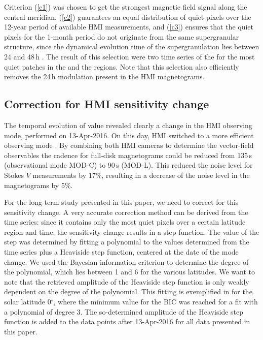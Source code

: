 \documentclass{aa}
\begin{document}
Criterion (\ref{c1}) was chosen to get the strongest magnetic field signal along the central meridian. (\ref{c2}) guarantees an equal distribution of quiet pixels over the 12-year period of available HMI measurements, and (\ref{c3}) ensures that the quiet pixels for the 1-month period do not originate from the same supergranular structure, since the dynamical evolution time of the supergranulation lies between 24 and 48\,h \cite[]{2010LRSP....7....2R}. The result of this selection were two time series of the \brms{} for the most quiet patches in the \NW{} and the \IN{} regions. 
Note that this selection also efficiently removes the 24\,h modulation present in the HMI magnetograms.

\subsection{Correction for HMI sensitivity change\label{sensicorr}}

The temporal evolution of \inw{} \brms{} value
revealed clearly a change in the HMI observing mode, performed on 13-Apr-2016. On this day, HMI switched to a more efficient observing mode \cite[see][]{2018SoPh..293...45H,2014SoPh..289.3483H,2016SoPh..291.1887C}. By combining both HMI cameras to determine the vector-field observables the cadence for full-disk magnetograms could be reduced from 135\,s (observational mode MOD-C) to 90\,s (MOD-L). This reduced the noise level for Stokes $V$ measurements by 17\%, resulting in a decrease of the noise level in the \los{} magnetograms by 5\%.

For the long-term study presented in this paper, we need to correct for this sensitivity change. A very accurate correction method can be derived from the \inw{} time series: since it contains only the most quiet pixels over a certain latitude region and time, the sensitivity change results in a step function. The value of the step was determined by fitting a polynomial to the \brms{} values determined from the \inw{} time series plus a Heaviside step function, centered at the date of the mode change. We used the Bayesian information criterion \cite[BIC,][]{Stoica2004} to determine the degree of the polynomial, which lies between 1 and 6 for the various latitudes. We want to note that the retrieved amplitude of the Heaviside step function is only weakly dependent on the degree of the polynomial. This fitting is exemplified in  for the solar latitude 0$^\circ$, where the minimum value for the BIC was reached for a fit with a polynomial of 
degree 3. 
The so-determined amplitude of the Heaviside step function is added to the 
\brms{}
data points after 13-Apr-2016 for all data presented in this paper.
\end{document}
